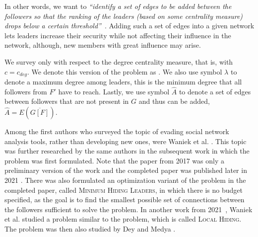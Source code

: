 In other words, we want to \emph{``identify a set of edges to be added between the followers so that
the ranking of the leaders (based on some centrality measure) drops below a certain threshold''}~\cite{Waniek2017}.
Adding such a set of edges into a given network lets leaders increase their security while not affecting their
influence in the network, although, new members with great influence may arise.

We survey \HLshort only with respect to the degree centrality measure, that is, with $c = c_{deg}$.
We denote this version of the problem as \HLdeg.
We also use symbol $\lambda$ to denote a maximum degree among leaders, this is the minimum degree that
all followers from $F'$ have to reach.
Lastly, we use symbol $\hat{A}$ to denote a set of edges between followers that are not present in $G$ and thus can be added,
$\hat{A} = E(\overline{G[F]})$.

Among the first authors who surveyed the topic of evading social network analysis tools, rather than developing new ones,
were Waniek et al. \cite{Waniek2016}.
This topic was further researched by the same authors in the subsequent work \cite{Waniek2017}
in which the \HL problem was first formulated.
Note that the paper from 2017 was only a preliminary version of the work and the completed paper was
published later in 2021 \cite{Waniek2021full}.
There was also formulated an optimization variant of the \HL problem in the completed paper, called \textsc{Minimum Hiding Leaders}, 
in which there is no budget specified, as the goal is to find the smallest possible set of connections between the followers
sufficient to solve the problem.
In another work from 2021~\cite{Waniek2021}, Waniek et al. studied a problem similar to the \HL problem,
which is called \textsc{Local Hiding}.
The \HL problem was then also studied by Dey and Medya \cite{Dey2019}.


